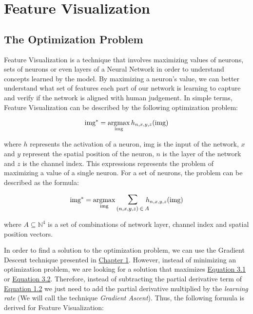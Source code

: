 \chapter{Feature Visualization}

\section{The Optimization Problem}

Feature Visualization is a technique that involves maximizing values of neurons, sets of neurons or even layers of a Neural Network in order to understand concepts learned by the model.
By maximizing a neuron's value, we can better understand what set of features each part of our network is learning to capture and verify if the network is aligned with human judgement.
In simple terms, Feature Visualization can be described by the following optimization problem:

\begin{equation}
    \text{img}^* = \operatorname*{argmax}_{\text{img}} h_{n, x, y, z} (\text{img})
    \label{eq:feat_vis_optimization}
\end{equation}

\noindent where \(h\) represents the activation of a neuron, img is the input of the network, \(x\) and \(y\) represent the spatial position of the neuron, \(n\) is the layer of the network and \(z\) is the channel index.
This expressions represents the problem of maximizing a value of a single neuron. For a set of neurons, the problem can be described as the formula:

\begin{equation}
    \text{img}^* =  \argmax_{\text{img}} \mathlarger{\mathlarger{\sum}}_{(n, x, y, z) \: \in \: A} \!\!\! h_{n, x, y, z} (\text{img})
    \label{eq:feat_vis_optimization_multivar}
\end{equation}

where \(A \subseteq \mathbb{N}^4\) is a set of combinations of network layer, channel index and spatial position vectors.

In order to find a solution to the optimization problem, we can use the Gradient Descent technique presented in \hyperref[sec:gradient_descent]{Chapter 1}.
However, instead of minimizing an optimization problem, we are looking for a solution that maximizes \hyperref[eq:feat_vis_optimization]{Equation 3.1} or \hyperref[eq:feat_vis_optimization_multivar]{Equation 3.2}.
Therefore, instead of subtracting the partial derivative term of \hyperref[eq:gradient_descent]{Equation 1.2} we just need to add the partial derivative multiplied by the \emph{learning rate} (We will call the technique \emph{Gradient Ascent}). 
Thus, the following formula is derived for Feature Visualization:

